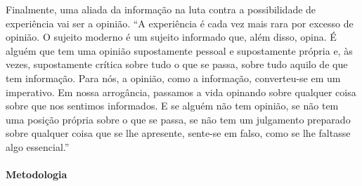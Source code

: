 \documentclass[12pt]{extarticle}
\begin{document}
Finalmente, uma aliada da informação na luta contra a possibilidade de 
experiência vai ser a opinião. ``A experiência é cada vez mais
rara por excesso de opinião. O sujeito moderno é um
sujeito informado que, além disso, opina. É alguém
que tem uma opinião supostamente pessoal e supostamente própria e, às vezes, 
supostamente crítica sobre tudo o que se passa, sobre tudo aquilo de que tem
informação. Para nós, a opinião, como a informação,
converteu-se em um imperativo. Em nossa arrogância, passamos a vida opinando sobre qualquer coisa
sobre que nos sentimos informados. E se alguém não
tem opinião, se não tem uma posição própria sobre o
que se passa, se não tem um julgamento preparado
sobre qualquer coisa que se lhe apresente, sente-se em
falso, como se lhe faltasse algo essencial.''

\paragraph{Metodologia}
\end{document}
